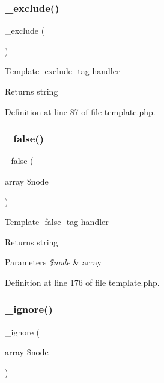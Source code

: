 \subsubsection{\texorpdfstring{\+\_\+exclude()}{\_exclude()}}
{\footnotesize\ttfamily \+\_\+exclude (\begin{DoxyParamCaption}{ }\end{DoxyParamCaption})\hspace{0.3cm}{\ttfamily [protected]}}

\hyperlink{class_template}{Template} -\/exclude-\/ tag handler \begin{DoxyReturn}{Returns}
string 
\end{DoxyReturn}


Definition at line 87 of file template.\+php.

\hypertarget{class_template_ae21eec23514830fab4659fff6d031fac}{}\label{class_template_ae21eec23514830fab4659fff6d031fac} 
\subsubsection{\texorpdfstring{\+\_\+false()}{\_false()}}
{\footnotesize\ttfamily \+\_\+false (\begin{DoxyParamCaption}\item[{array}]{\$node }\end{DoxyParamCaption})\hspace{0.3cm}{\ttfamily [protected]}}

\hyperlink{class_template}{Template} -\/false-\/ tag handler \begin{DoxyReturn}{Returns}
string 
\end{DoxyReturn}

\begin{DoxyParams}{Parameters}
{\em \$node} & array \\
\hline
\end{DoxyParams}


Definition at line 176 of file template.\+php.

\hypertarget{class_template_a8e0acee0de043ee22d704799c0858dda}{}\label{class_template_a8e0acee0de043ee22d704799c0858dda} 
\subsubsection{\texorpdfstring{\+\_\+ignore()}{\_ignore()}}
{\footnotesize\ttfamily \+\_\+ignore (\begin{DoxyParamCaption}\item[{array}]{\$node }\end{DoxyParamCaption})\hspace{0.3cm}{\ttfamily [protected]}}

